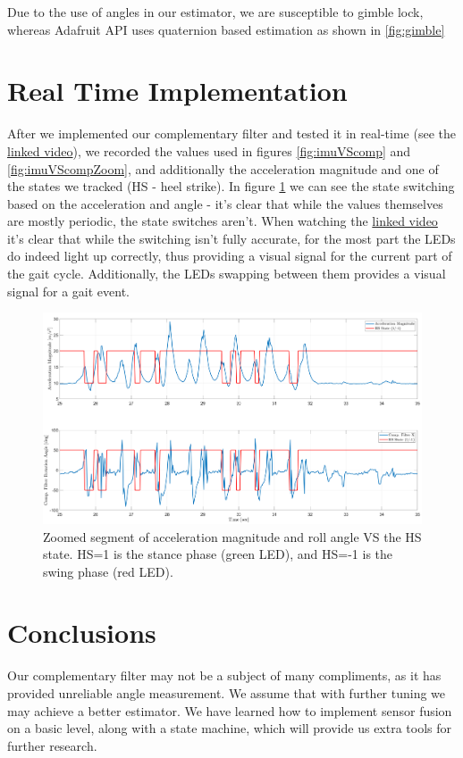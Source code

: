 \documentclass[10pt]{article}
\begin{document}
Due to the use of angles in our estimator, we are susceptible to gimble lock, whereas Adafruit API uses quaternion based estimation as shown in \ref{fig:gimble} 

\section{Real Time Implementation}
After we implemented our complementary filter and tested it in real-time (see the \href{https://technionmail-my.sharepoint.com/:v:/g/personal/eitangerber_campus_technion_ac_il/EU1nMidRcjNCnH50mRiva4IBxQMdXuteN7KhcMnGKk0lfQ?e=57vjzk}{linked video}), we recorded the values used in figures \ref{fig:imuVScomp} and \ref{fig:imuVScompZoom}, and additionally the acceleration magnitude and one of the states we tracked (HS - heel strike). In figure \ref{fig:states} we can see the state switching based on the acceleration and angle - it's clear that while the values themselves are mostly periodic, the state switches aren't. When watching the \href{https://technionmail-my.sharepoint.com/:v:/g/personal/eitangerber_campus_technion_ac_il/EU1nMidRcjNCnH50mRiva4IBxQMdXuteN7KhcMnGKk0lfQ?e=57vjzk}{linked video} it's clear that while the switching isn't fully accurate, for the most part the LEDs do indeed light up correctly, thus providing a visual signal for the current part of the gait cycle. Additionally, the LEDs swapping between them provides a visual signal for a gait event.

\begin{figure}[!h]
    \centering
    \includegraphics[width=0.75\linewidth]{imageStates.png}
    \caption{Zoomed segment of acceleration magnitude and roll angle VS the HS state. HS=1 is the stance phase (green LED), and HS=-1 is the swing phase (red LED).}
    \label{fig:states}
\end{figure}




\section{Conclusions}
Our complementary filter may not be a subject of many compliments, as it has provided unreliable angle measurement. We assume that with further tuning we may achieve a better estimator. We have learned how to implement sensor fusion on a basic level, along with a state machine, which will provide us extra tools for further research.   
\end{document}
